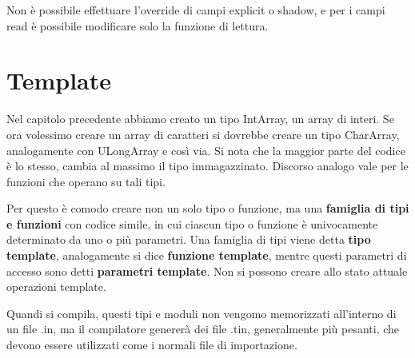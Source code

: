 \documentclass[10pt]{book}%
\newcommand{\e}{\`{e} }
\newcommand{\ac}[1]{\`{#1}}
\renewcommand{\emph}[1]{\textbf{#1}}
\begin{document}
Non \e possibile effettuare l'override di campi explicit o shadow, e per i campi read \e possibile modificare solo la funzione di lettura.

\chapter{Template}
Nel capitolo precedente abbiamo creato un tipo IntArray, un array di interi. Se ora volessimo creare un array di caratteri si dovrebbe creare un tipo CharArray, analogamente con ULongArray e cos\ac i via. Si nota che la maggior parte del codice \e lo stesso, cambia al massimo il tipo immagazzinato. Discorso analogo vale per le funzioni che operano su tali tipi.

Per questo \e comodo creare non un solo tipo o funzione, ma una \emph{famiglia di tipi e funzioni} con codice simile, in cui ciascun tipo o funzione \e univocamente determinato da uno o pi\ac u parametri. Una famiglia di tipi viene detta \emph{tipo template}, analogamente si dice \emph{funzione template}, mentre questi parametri di accesso sono detti \emph{parametri template}. Non si possono creare allo stato attuale operazioni template.

Quandi si compila, questi tipi e moduli non vengomo memorizzati all'interno di un file .in, ma il compilatore generer\ac a dei file .tin, generalmente pi\ac u pesanti, che devono essere utilizzati come i normali file di importazione.
\end{document}
